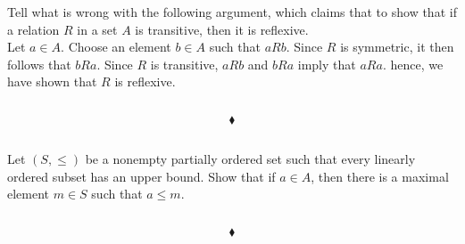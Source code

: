 \subsubsection{}
\begin{tcolorbox}
Tell what is wrong with the following argument, which claims that to show that if a relation $R$ in a set $A$ is transitive, then it is reflexive.
\\
Let $a\in A$. Choose an element $b\in A$ such that $aRb$. Since $R$ is symmetric, it then follows that $bRa$. Since $R$ is transitive, $aRb$ and $bRa$ imply that $aRa$. hence, we have shown that $R$ is reflexive.
\end{tcolorbox}
$$ $$

$$\blacklozenge$$

\renewcommand{\thesubsection}{\thesection.\RomanNumeralCaps{14}}
\subsection{}
\begin{tcolorbox}
Let $(S,\leq )$ be a nonempty partially ordered set such that every linearly ordered subset has an upper bound. Show that if $a\in A$, then there is a maximal element $m\in S$ such that $a\leq m$. 
\end{tcolorbox}
$$ $$

$$\blacklozenge$$
